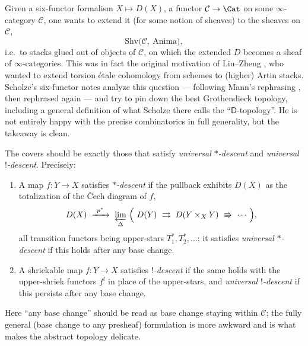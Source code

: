 \begin{remark}
\label{rmk:16:extension-question}
Given a six-functor formalism $X\mapsto D(X)$, a functor $\mathcal C\to\Cat$ on some
$\infty$-category $\mathcal C$, one wants to extend it (for some notion of sheaves) to
the sheaves on $\mathcal C$,
\begin{equation*}
\mathrm{Shv}\bigl(\mathcal C,\ \mathrm{Anima}\bigr),
\end{equation*}
i.e.\ to stacks glued out of objects of $\mathcal C$, on which the extended $D$ becomes a
sheaf of $\infty$-categories. This was in fact the original motivation of Liu--Zheng
\cite{liu2024enhancedoperationsbasechange}, who wanted to extend torsion \'etale
cohomology from schemes to (higher) Artin stacks. Scholze's six-functor notes
\cite{scholze2023six} analyze this question --- following Mann's rephrasing
\cite{mann2022padic6functorformalismrigidanalytic}, then rephrased again --- and try to
pin down the best Grothendieck topology, including a general definition of what Scholze
there calls the ``$\mathsf D$-topology''. He is not entirely happy with the precise
combinatorics in full generality, but the takeaway is clean.
\end{remark}

\begin{remark}
\label{rmk:16:takeaway}
The covers should be exactly those that satisfy \emph{universal $*$-descent} and
\emph{universal $!$-descent}. Precisely:
\begin{enumerate}
\item A map $f\colon Y\to X$ satisfies \emph{$*$-descent} if the pullback exhibits
$D(X)$ as the totalization of the \v Cech diagram of $f$,
\begin{equation*}
D(X)\ \xrightarrow{\ p^*\ }\ \varprojlim_{\Delta}\ \Bigl(\ D(Y)\ \rightrightarrows\ D(Y\times_X Y)\ \Rrightarrow\ \cdots\ \Bigr),
\end{equation*}
all transition functors being upper-stars $T_1^*,T_2^*,\dots$; it satisfies
\emph{universal $*$-descent} if this holds after any base change.
\item A shriekable map $f\colon Y\to X$ satisfies \emph{$!$-descent} if the same holds
with the upper-shriek functors $f^!$ in place of the upper-stars, and \emph{universal
$!$-descent} if this persists after any base change.
\end{enumerate}
Here ``any base change'' should be read as base change staying within $\mathcal C$; the
fully general (base change to any presheaf) formulation is more awkward and is what
makes the abstract topology delicate.
\end{remark}

